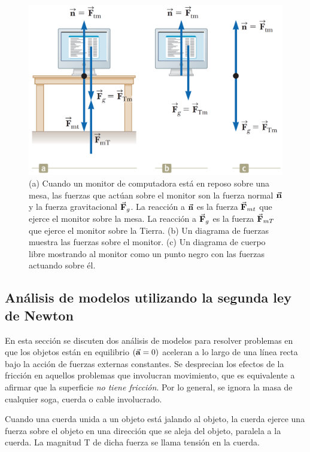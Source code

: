     \begin{figure}[H]
      \centering
      \includegraphics[scale=0.3]{1/graphics_5/figure_3}
      \caption{(a) Cuando un monitor de computadora está en reposo sobre una mesa, las fuerzas que actúan sobre el
      monitor son la fuerza normal $\vec{\mathbf{n}}$ y la fuerza gravitacional $\vec{\mathbf{F}}_{g}$. La reacción a $\vec{\mathbf{n}}$ es la fuerza
      $\vec{\mathbf{F}}_{mt}$ que ejerce el monitor sobre la mesa. La reacción a $\vec{\mathbf{F}}_{g}$ es la fuerza $\vec{\mathbf{F}}_{mT}$ que
      ejerce el monitor sobre la Tierra. (b) Un diagrama de fuerzas muestra las fuerzas sobre el monitor. (c) Un
      diagrama de cuerpo libre mostrando al monitor como un punto negro con las fuerzas actuando sobre él.}
    \end{figure}

  \subsection{Análisis de modelos utilizando la segunda ley de Newton}
    \PN En esta sección se discuten dos análisis de modelos para resolver problemas en que los objetos están en
    equilibrio $(\vec{\mathbf{a}} = 0)$ aceleran a lo largo de una línea recta bajo la acción de fuerzas externas constantes. Se
    desprecian los efectos de la fricción en aquellos problemas que involucran movimiento, que es equivalente a afirmar
    que la superficie \textit{no tiene fricción}. Por lo general, se ignora la masa de cualquier soga, cuerda o cable
    involucrado.

    \PN Cuando una cuerda unida a un objeto está jalando al objeto, la cuerda ejerce una fuerza sobre el objeto en una
    dirección que se aleja del objeto, paralela a la cuerda. La magnitud T de dicha fuerza se llama tensión en la cuerda.


